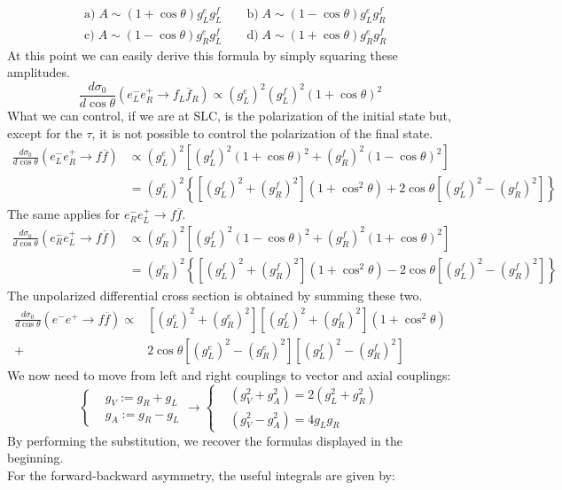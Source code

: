 \documentclass[../main.tex]{subfiles}
\begin{document}
\[
\begin{aligned}
&\text{a)}\;A\sim(1+\cos\theta)g_L^eg_L^f \qquad \text{b)}\; A\sim(1-\cos\theta)g_L^eg_R^f\\
&\text{c)}\; A\sim(1-\cos\theta)g_R^eg_L^f \qquad
\text{d)}\; A\sim(1+\cos\theta)g_R^eg_R^f
\end{aligned}
\]
At this point we can easily derive this formula by simply squaring these amplitudes.
\[
\frac{d\sigma_0}{d\cos\theta}(e_L^-e_R^+\to f_L\overline{f}_R)\propto(g_L^e)^2(g_L^f)^2(1+\cos\theta)^2
\]
What we can control, if we are at SLC, is the polarization of the initial state but, except for the $\tau$, it is not possible to control the polarization of the final state. 
\[
\begin{aligned}
\frac{d\sigma_0}{d\cos\theta}(e_L^-e_R^+\to f\overline{f})&\propto(g_L^e)^2\left[(g_L^f)^2(1+\cos\theta)^2+(g_R^f)^2(1-\cos\theta)^2\right]\\
&=(g_L^e)^2\left\{[(g_L^f)^2+(g_R^f)^2](1+\cos^2\theta)+2\cos\theta[(g_L^f)^2-(g_R^f)^2]\right\}
\end{aligned}
\]
The same applies for $e_R^-e_L^+\to f\overline{f}$.
\[
\begin{aligned}
\frac{d\sigma_0}{d\cos\theta}(e_R^-e_L^+\to f\overline{f})&\propto(g_R^e)^2\left[(g_L^f)^2(1-\cos\theta)^2+(g_R^f)^2(1+\cos\theta)^2\right]\\
&=(g_R^e)^2\left\{[(g_L^f)^2+(g_R^f)^2](1+\cos^2\theta)-2\cos\theta[(g_L^f)^2-(g_R^f)^2]\right\}
\end{aligned}
\]
The unpolarized differential cross section is obtained by summing these two.
\begin{align*}
\frac{d\sigma_0}{d\cos\theta}(e^-e^+\to f\overline{f})\propto&[(g_L^e)^2+(g_R^e)^2][(g_L^f)^2+(g_R^f)^2](1+\cos^2\theta)\\
+&2\cos\theta[(g_L^e)^2-(g_R^e)^2][(g_L^f)^2-(g_R^f)^2]
\end{align*}
We now need to move from left and right couplings to vector and axial couplings:
\[
\left\{
\begin{aligned}
&g_V:=g_R+g_L\\
&g_A:=g_R-g_L
\end{aligned}
\right.
\to
\left\{
\begin{aligned}
&(g_V^2+g_A^2)=2(g_L^2+g_R^2)\\
&(g_V^2-g_A^2)=4g_Lg_R
\end{aligned}
\right.
\]
By performing the substitution, we recover the formulas displayed in the beginning.\\
For the forward-backward asymmetry, the useful integrals are given by:
\end{document}
